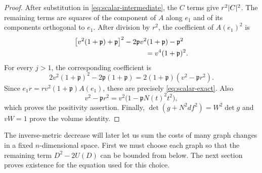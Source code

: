 \begin{proof}
After substitution in \eqref{eq:scalar-intermediate}, the $C$ terms give
$r^2\lvert C\rvert^2$. The remaining terms are squares of the component of $A$
along $e_1$ and of its components orthogonal to $e_1$. After division by
$r^2$, the coefficient of $A(e_1)^2$ is
\[
 \begin{split}
 &\bigl[v^2(1+\mathfrak p)+\mathfrak p\bigr]^2
       -2\mathfrak p v^2(1+\mathfrak p)-\mathfrak p^2\\
 &\hspace{35mm}=v^4(1+\mathfrak p)^2.
 \end{split}
\]
For every $j>1$, the corresponding coefficient is
\[
 2v^2(1+\mathfrak p)^2-2\mathfrak p(1+\mathfrak p)
       =2(1+\mathfrak p)(v^2-\mathfrak p r^2).
\]
Since $e_1r=rv^2(1+\mathfrak p)A(e_1)$, these are precisely
\eqref{eq:scalar-exact}. Also
\[
 v^2-\mathfrak p r^2=v^2\bigl(1-\mathfrak p N(t)^2t^2\bigr),
\]
which proves the positivity assertion. Finally,
$\det(g+N^2df^2)=W^2\det g$ and $vW=1$ prove the volume identity.
\end{proof}

The inverse-metric decrease will later let us sum the costs of many graph
changes in a fixed $n$-dimensional space. First we must choose each graph
so that the remaining term $D^2-2U(D)$ can be bounded from below.
The next section proves existence for the equation used for this choice.
